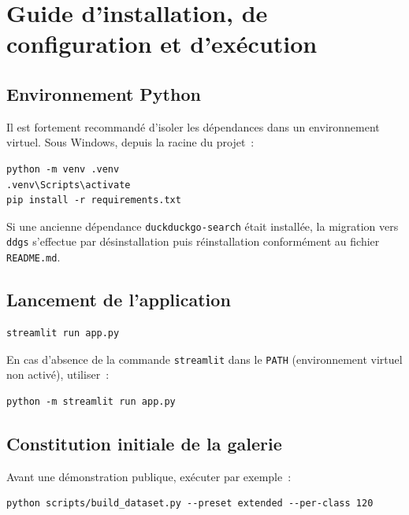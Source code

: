 \documentclass[11pt,a4paper,openany]{report}
\begin{document}
\appendix

\chapter{Guide d'installation, de configuration et d'exécution}

\section{Environnement Python}

Il est fortement recommandé d'isoler les dépendances dans un environnement virtuel. Sous Windows, depuis la racine du projet~:

\begin{lstlisting}
python -m venv .venv
.venv\Scripts\activate
pip install -r requirements.txt
\end{lstlisting}

Si une ancienne dépendance \texttt{duckduckgo-search} était installée, la migration vers \texttt{ddgs} s'effectue par désinstallation puis réinstallation conformément au fichier \texttt{README.md}.

\section{Lancement de l'application}

\begin{lstlisting}
streamlit run app.py
\end{lstlisting}

En cas d'absence de la commande \texttt{streamlit} dans le \texttt{PATH} (environnement virtuel non activé), utiliser~:

\begin{lstlisting}
python -m streamlit run app.py
\end{lstlisting}

\section{Constitution initiale de la galerie}

Avant une démonstration publique, exécuter par exemple~:

\begin{lstlisting}
python scripts/build_dataset.py --preset extended --per-class 120
\end{lstlisting}
\end{document}
